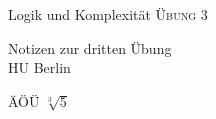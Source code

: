 \documentclass[12pt]{article}
\begin{document}
\begin{center}
\Large
Logik und Komplexität  \textsc{ Übung 3 }
\end{center}

\begin{flushright}
Notizen zur dritten Übung\\
HU Berlin \\

\vspace{2 mm}

\end{flushright}

ÄÖÜ $ \sqrt[3]{5} $
\end{document}
